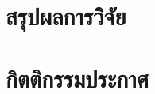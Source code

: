 \documentclass[12pt,a4paper,twocolumn]{article}
\begin{document}
\section{สรุปผลการวิจัย}


\section{กิตติกรรมประกาศ}




\end{document}
